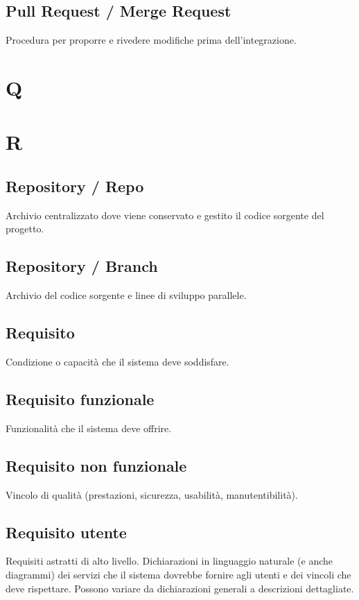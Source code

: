 \documentclass[a4paper,12pt]{article}
\begin{document}
\subsection{Pull Request / Merge Request}
Procedura per proporre e rivedere modifiche prima dell’integrazione.

\section{Q}

\section{R}

\subsection{Repository / Repo}
Archivio centralizzato dove viene conservato e gestito il codice sorgente del progetto.

\subsection{Repository / Branch}
Archivio del codice sorgente e linee di sviluppo parallele.

\subsection{Requisito}
Condizione o capacità che il sistema deve soddisfare.

\subsection{Requisito funzionale}
Funzionalità che il sistema deve offrire.

\subsection{Requisito non funzionale}
Vincolo di qualità (prestazioni, sicurezza, usabilità, manutentibilità).

\subsection{Requisito utente}
Requisiti astratti di alto livello.  
Dichiarazioni in linguaggio naturale (e anche diagrammi) dei servizi che il sistema dovrebbe fornire agli utenti e dei vincoli che deve rispettare.  
Possono variare da dichiarazioni generali a descrizioni dettagliate.
\end{document}
